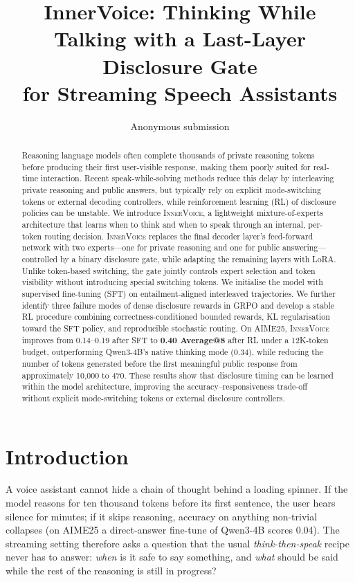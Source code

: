 \documentclass[letterpaper]{article} %
\title{InnerVoice: Thinking While Talking with a Last-Layer Disclosure Gate\\for Streaming Speech Assistants}
\author{Anonymous submission}
\newcommand{\iv}{\textsc{InnerVoice}}
\begin{document}
\maketitle

\begin{abstract}
Reasoning language models often complete thousands of private reasoning tokens before producing their first user-visible response, making them poorly suited for real-time interaction. Recent speak-while-solving methods reduce this delay by interleaving private reasoning and public answers, but typically rely on explicit mode-switching tokens or external decoding controllers, while reinforcement learning (RL) of disclosure policies can be unstable.
We introduce \iv{}, a lightweight mixture-of-experts architecture that learns when to think and when to speak through an internal, per-token routing decision. \iv{} replaces the final decoder layer's feed-forward network with two experts---one for private reasoning and one for public answering---controlled by a binary disclosure gate, while adapting the remaining layers with LoRA. Unlike token-based switching, the gate jointly controls expert selection and token visibility without introducing special switching tokens. We initialise the model with supervised fine-tuning (SFT) on entailment-aligned interleaved trajectories.
We further identify three failure modes of dense disclosure rewards in GRPO and develop a stable RL procedure combining correctness-conditioned bounded rewards, KL regularisation toward the SFT policy, and reproducible stochastic routing. On AIME25, \iv{} improves from 0.14--0.19 after SFT to \textbf{0.40 Average@8} after RL under a 12K-token budget, outperforming Qwen3-4B's native thinking mode (0.34), while reducing the number of tokens generated before the first meaningful public response from approximately 10,000 to 470.
These results show that disclosure timing can be learned within the model architecture, improving the accuracy--responsiveness trade-off without explicit mode-switching tokens or external disclosure controllers.
\end{abstract}

\section{Introduction}
A voice assistant cannot hide a chain of thought behind a loading spinner. If the model reasons for ten thousand tokens before its first sentence, the user hears silence for minutes; if it skips reasoning, accuracy on anything non-trivial collapses (on AIME25 a direct-answer fine-tune of Qwen3-4B scores 0.04). The streaming setting therefore asks a question that the usual \emph{think-then-speak} recipe never has to answer: \emph{when} is it safe to say something, and \emph{what} should be said while the rest of the reasoning is still in progress?
\end{document}

